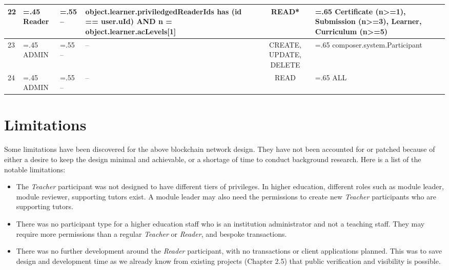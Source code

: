 \begin{landscape}
\begin{table}
\begin{tabularx}{24cm}{l>{\hsize=.45\hsize}X>{\hsize=.55\hsize}X>{\hsize=0.9\hsize}Xc>{\hsize=.65\hsize}X}
			\midrule
			22 & Reader  & --                                            & object.learner.priviledgedReaderIds has (id == user.uId) AND n = object.learner.acLevels[1] & READ*                  & Certificate (n>=1), \newline Submission (n>=3), \newline Learner, Curriculum (n>=5) \\
			\midrule
			23 & ADMIN   & --                                            & --                                                                                          & CREATE, UPDATE, DELETE & composer.system.Participant                                                                        \\
			\midrule
			24 & ADMIN   & --                                            & --                                                                                          & READ                   & ALL                                                                                 \\
			\bottomrule
		\end{tabularx}
	\end{table}
\end{landscape}

\section{Limitations}

Some limitations have been discovered for the above blockchain network design. They have not been accounted for or patched
because of either a desire to keep the design minimal and achievable, or a shortage of time to conduct background research.
Here is a list of the notable limitations:

\begin{itemize}
	\item The \textit{Teacher} participant was not designed to have different tiers of privileges. In higher education,
	      different roles such as module leader, module reviewer, supporting tutors exist. A module leader may also need the
	      permissions to create new \textit{Teacher} participants who are supporting tutors.
	\item There was no participant type for a higher education staff who is an institution administrator and not a teaching staff.
		  They may require more permissions than a regular \textit{Teacher} or \textit{Reader}, and bespoke transactions.
	\item There was no further development around the \textit{Reader} participant, with no transactions or client applications planned.
		  This was to save design and development time as we already know from existing projects (Chapter 2.5) that public verification 
		  and visibility is possible.	
\end{itemize}

